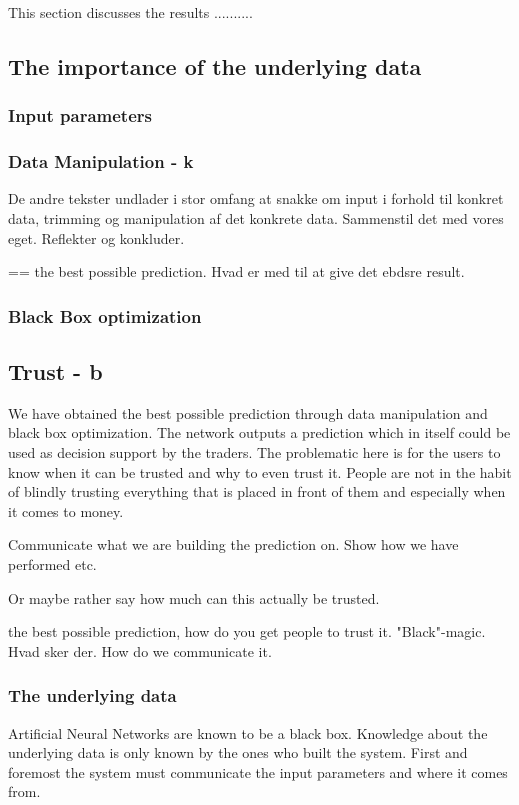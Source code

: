 This section discusses the results ..........

\subsection{The importance of the underlying data}

\subsubsection{Input parameters}

\subsubsection{Data Manipulation - k}
De andre tekster undlader i stor omfang at snakke om input i forhold til konkret data, trimming og manipulation af det konkrete data. Sammenstil det med vores eget. Reflekter og konkluder.

== the best possible prediction. Hvad er med til at give det ebdsre result.

\subsubsection{Black Box optimization}



\subsection{Trust - b}
We have obtained the best possible prediction through data manipulation and black box optimization. The network outputs a prediction which in itself could be used as decision support by the traders. The problematic here is for the users to know when it can be trusted and why to even trust it. People are not in the habit of blindly trusting everything that is placed in front of them and especially when it comes to money.


Communicate what we are building the prediction on. Show how we have performed etc.


Or maybe rather say how much can this actually be trusted.

 
the best possible prediction, how do you get people to trust it. "Black"-magic. Hvad sker der.
How do we communicate it.

\subsubsection{The underlying data}
Artificial Neural Networks are known to be a black box. Knowledge about the underlying data is only known by the ones who built the system. First and foremost the system must communicate the input parameters and where it comes from.

